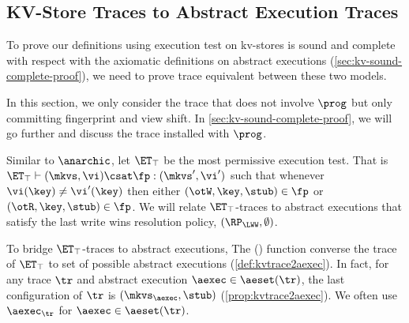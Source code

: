 \subsection{KV-Store Traces to Abstract Execution Traces}
\label{sec:kvtrace2aexec}

To prove our definitions using execution test on kv-stores 
is sound and complete with respect with the axiomatic definitions on abstract executions (\cref{sec:kv-sound-complete-proof}),
we need to prove trace equivalent between these two models.

In this section, we only consider the trace that does not involve \( \prog \) but only committing fingerprint and view shift.
In \cref{sec:kv-sound-complete-proof}, we will go further and discuss the trace installed with \( \prog \).

Similar to \(\anarchic\), let $\ET_\top$ be the most permissive execution test.
That is $\ET_\top \vdash (\mkvs, \vi) \csat \fp: (\mkvs',\vi')$ 
such that whenever $\vi(\key) \neq \vi'(\key)$ then either $(\otW, \key, \stub) \in \fp$ or $(\otR, \key, \stub) \in \fp$.
We will relate $\ET_{\top}$-traces to abstract executions that satisfy the last write wins resolution policy, \ie \( (\RP_{\LWW}, \emptyset) \).

To bridge $\ET_{\top}$-traces to abstract executions, 
The \aeset(\tr) function converse the trace of \( \ET_\top \) to set of possible abstract executions (\cref{def:kvtrace2aexec}).
In fact, for any trace \( \tr \) and abstract execution $\aexec \in \aeset(\tr)$, 
the last configuration of $\tr$ is $(\mkvs_{\aexec}, \stub)$ (\cref{prop:kvtrace2aexec}).
We often use \( \aexec_\tr \) for \( \aexec \in \aeset(\tr) \).

